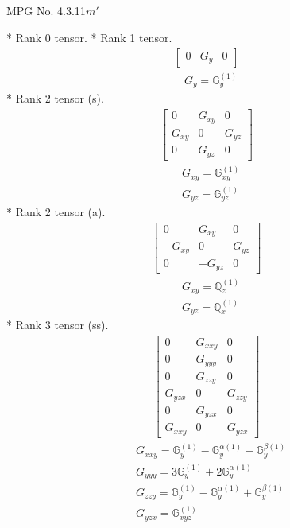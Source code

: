 \documentclass[fleqn,8pt,landscape]{jsarticle}
\begin{document}
\setcounter{MaxMatrixCols}{32}

\renewcommand{\tablename}{Table~}
\renewcommand{\figurename}{Figure~}
\begin{center}
\LARGE
MPG No. 4.3.11\quad$m'$
\end{center}
* Rank 0 tensor.
* Rank 1 tensor.
\begin{align*}
\begin{bmatrix} 0 & G_{y} & 0 \end{bmatrix}
\end{align*}
\begin{align*}
& G_{y} = \mathbb{G}_{y}^{(1)}
\end{align*}
* Rank 2 tensor (s).
\begin{align*}
\begin{bmatrix} 0 & G_{xy} & 0 \\ G_{xy} & 0 & G_{yz} \\ 0 & G_{yz} & 0 \end{bmatrix}
\end{align*}
\begin{align*}
& G_{xy} = \mathbb{G}_{xy}^{(1)} \\
& G_{yz} = \mathbb{G}_{yz}^{(1)}
\end{align*}
* Rank 2 tensor (a).
\begin{align*}
\begin{bmatrix} 0 & G_{xy} & 0 \\ - G_{xy} & 0 & G_{yz} \\ 0 & - G_{yz} & 0 \end{bmatrix}
\end{align*}
\begin{align*}
& G_{xy} = \mathbb{Q}_{z}^{(1)} \\
& G_{yz} = \mathbb{Q}_{x}^{(1)}
\end{align*}
* Rank 3 tensor (ss).
\begin{align*}
\begin{bmatrix} 0 & G_{xxy} & 0 \\ 0 & G_{yyy} & 0 \\ 0 & G_{zzy} & 0 \\ G_{yzx} & 0 & G_{zzy} \\ 0 & G_{yzx} & 0 \\ G_{xxy} & 0 & G_{yzx} \end{bmatrix}
\end{align*}
\begin{align*}
& G_{xxy} = \mathbb{G}_{y}^{(1)} - \mathbb{G}_{y}^{\alpha(1)} - \mathbb{G}_{y}^{\beta(1)} \\
& G_{yyy} = 3 \mathbb{G}_{y}^{(1)} + 2 \mathbb{G}_{y}^{\alpha(1)} \\
& G_{zzy} = \mathbb{G}_{y}^{(1)} - \mathbb{G}_{y}^{\alpha(1)} + \mathbb{G}_{y}^{\beta(1)} \\
& G_{yzx} = \mathbb{G}_{xyz}^{(1)}
\end{align*}
\end{document}
